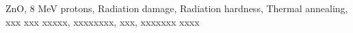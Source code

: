 \documentclass{ujarticle}
\begin{document}
\vspace*{-2.5mm}

\vspace*{-2.5mm}
\begin{center}
\begin{minipage}{130mm}
\baselineskip 12pt
{\fontsize{9.5pt}{0pt}\selectfont  %
ZnO, 8 MeV protons, Radiation damage, Radiation hardness,
Thermal annealing, xxx xxx xxxxx, xxxxxxxx, xxx, xxxxxxx xxxx
}
\end{minipage}
\end{center}
\end{document}
